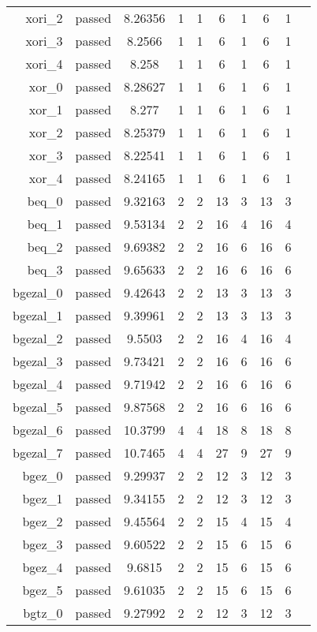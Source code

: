 \begin{longtable}{r|ccccccccc}
    xori\_2 & passed & 8.26356 & 1 & 1 & 6 & 1 & 6 & 1 \\
    xori\_3 & passed & 8.2566 & 1 & 1 & 6 & 1 & 6 & 1 \\
    xori\_4 & passed & 8.258 & 1 & 1 & 6 & 1 & 6 & 1 \\
    xor\_0 & passed & 8.28627 & 1 & 1 & 6 & 1 & 6 & 1 \\
    xor\_1 & passed & 8.277 & 1 & 1 & 6 & 1 & 6 & 1 \\
    xor\_2 & passed & 8.25379 & 1 & 1 & 6 & 1 & 6 & 1 \\
    xor\_3 & passed & 8.22541 & 1 & 1 & 6 & 1 & 6 & 1 \\
    xor\_4 & passed & 8.24165 & 1 & 1 & 6 & 1 & 6 & 1 \\
    beq\_0 & passed & 9.32163 & 2 & 2 & 13 & 3 & 13 & 3 \\
    beq\_1 & passed & 9.53134 & 2 & 2 & 16 & 4 & 16 & 4 \\
    beq\_2 & passed & 9.69382 & 2 & 2 & 16 & 6 & 16 & 6 \\
    beq\_3 & passed & 9.65633 & 2 & 2 & 16 & 6 & 16 & 6 \\
    bgezal\_0 & passed & 9.42643 & 2 & 2 & 13 & 3 & 13 & 3 \\
    bgezal\_1 & passed & 9.39961 & 2 & 2 & 13 & 3 & 13 & 3 \\
    bgezal\_2 & passed & 9.5503 & 2 & 2 & 16 & 4 & 16 & 4 \\
    bgezal\_3 & passed & 9.73421 & 2 & 2 & 16 & 6 & 16 & 6 \\
    bgezal\_4 & passed & 9.71942 & 2 & 2 & 16 & 6 & 16 & 6 \\
    bgezal\_5 & passed & 9.87568 & 2 & 2 & 16 & 6 & 16 & 6 \\
    bgezal\_6 & passed & 10.3799 & 4 & 4 & 18 & 8 & 18 & 8 \\
    bgezal\_7 & passed & 10.7465 & 4 & 4 & 27 & 9 & 27 & 9 \\
    bgez\_0 & passed & 9.29937 & 2 & 2 & 12 & 3 & 12 & 3 \\
    bgez\_1 & passed & 9.34155 & 2 & 2 & 12 & 3 & 12 & 3 \\
    bgez\_2 & passed & 9.45564 & 2 & 2 & 15 & 4 & 15 & 4 \\
    bgez\_3 & passed & 9.60522 & 2 & 2 & 15 & 6 & 15 & 6 \\
    bgez\_4 & passed & 9.6815 & 2 & 2 & 15 & 6 & 15 & 6 \\
    bgez\_5 & passed & 9.61035 & 2 & 2 & 15 & 6 & 15 & 6 \\
    bgtz\_0 & passed & 9.27992 & 2 & 2 & 12 & 3 & 12 & 3 \\

\end{longtable}
